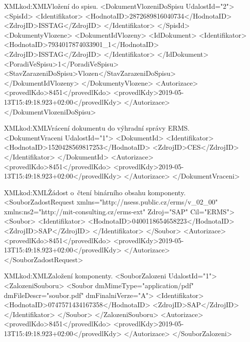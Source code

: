 \documentclass[
  master,
  field=ainfp,
  biblatex,
  language=czech,
  glossaries,
  theorems=false,
  index
]{kidiplom}
\begin{document}
\begin{kicode}{XML}{kod:XML}{Vložení do spisu.}
<DokumentVlozeniDoSpisu UdalostId="2">
    <SpisId>
        <Identifikator>
            <HodnotaID>2872689816040734</HodnotaID>
            <ZdrojID>ISSTAG</ZdrojID>
        </Identifikator>
    </SpisId>
    <DokumentyVlozene>
        <DokumentIdVlozeny>
            <IdDokument>
                <Identifikator>
                    <HodnotaID>7934017874033901_1</HodnotaID>
                    <ZdrojID>ISSTAG</ZdrojID>
                </Identifikator>
            </IdDokument>
            <PoradiVeSpisu>1</PoradiVeSpisu>
            <StavZarazeniDoSpisu>Vlozen</StavZarazeniDoSpisu>
        </DokumentIdVlozeny>
    </DokumentyVlozene>
    <Autorizace>
        <provedlKdo>8451</provedlKdo>
        <provedlKdy>2019-05-13T15:49:18.923+02:00</provedlKdy>
    </Autorizace>
</DokumentVlozeniDoSpisu>
\end{kicode}

\begin{kicode}{XML}{kod:XML}{Vrácení dokumentu do výhradní správy ERMS.}
<DokumentVraceni UdalostId="1">
    <DokumentId>
        <Identifikator>
            <HodnotaID>1520428569817253</HodnotaID>
            <ZdrojID>CES</ZdrojID>
       </Identifikator>
    </DokumentId>
    <Autorizace>
        <provedlKdo>8451</provedlKdo>
        <provedlKdy>2019-05-13T15:49:18.923+02:00</provedlKdy>
    </Autorizace>
</DokumentVraceni>
\end{kicode}

\begin{kicode}{XML}{kod:XML}{Žádost o~čtení binárního obsahu komponenty.}
<SouborZadostRequest xmlns="http://nsess.public.cz/erms/v_02_00" 
    xmlns:ns2="http://mit-consulting.cz/erms-ext" Zdroj="SAP" Cil="ERMS">
    <Soubor>
        <Identifikator>
            <HodnotaID>0400118654658223</HodnotaID>
            <ZdrojID>SAP</ZdrojID>
        </Identifikator>
    </Soubor>
    <Autorizace>
        <provedlKdo>8451</provedlKdo>
        <provedlKdy>2019-05-13T15:49:18.923+02:00</provedlKdy>
    </Autorizace>
</SouborZadostRequest>
\end{kicode}

\begin{kicode}{XML}{kod:XML}{Založení komponenty.}
<SouborZalozeni UdalostId="1">
    <ZalozeniSouboru>
        <Soubor dmMimeType="application/pdf" dmFileDescr="soubor.pdf" dmFinalniVerze="A">
            <Identifikator>
                <HodnotaID>0747571434167358</HodnotaID>
                <ZdrojID>SAP</ZdrojID>
            </Identifikator>
        </Soubor>
    </ZalozeniSouboru>
    <Autorizace>
        <provedlKdo>8451</provedlKdo>
        <provedlKdy>2019-05-13T15:49:18.923+02:00</provedlKdy>
    </Autorizace>
</SouborZalozeni>
\end{kicode}
\end{document}
